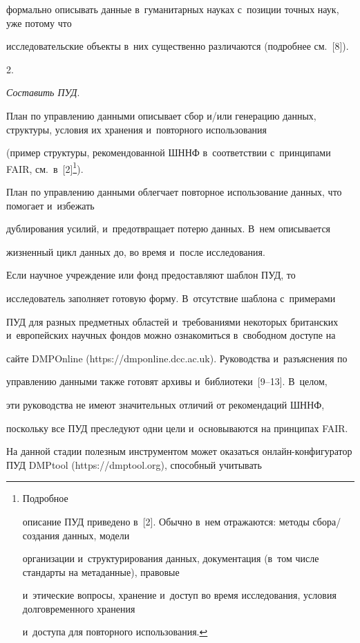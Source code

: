 формально описывать данные в~гуманитарных науках с~позиции точных наук, уже потому что 

исследовательские объекты в~них существенно различаются (подробнее см.~[8]).



2.

\textit{Составить ПУД}.



План по управлению данными описывает сбор и/или генерацию данных, структуры, условия их хранения и~повторного использования 

(пример структуры, рекомендованной ШННФ в~соответствии с~принципами FAIR, см.\ в~[2]\footnote{Подробное 

описание ПУД приведено в~[2]. Обычно в~нем отражаются: методы сбора/создания данных, модели 

организации и~структурирования данных, документация (в~том чис\-ле стандарты на метаданные), правовые 

и~этические вопросы, хранение и~доступ во время исследования, условия долговременного хранения 

и~доступа для повторного использования.}).

  

  План по управлению данными облегчает повторное использование данных, что помогает и~избежать 

дублирования усилий, и~предотвращает потерю данных. В~нем описывается 

жизненный цикл данных до, во время и~после исследования.

  

  Если научное учреждение или фонд предоставляют шаблон ПУД, то 

исследователь заполняет готовую форму. В~отсутствие шаблона с~примерами 

ПУД для разных предметных областей и~требованиями некоторых британских и~европейских научных фондов можно ознакомиться в~свободном доступе на 

сайте DMPOnline ({\sf https://dmponline.dcc.ac.uk}). Руководства и~разъяснения по 

управлению данными также готовят архивы и~библиотеки~[9--13]. В~целом, 

эти руководства не имеют значительных отличий от рекомендаций ШННФ, 

поскольку все ПУД преследуют одни цели и~основываются на принципах FAIR.

  

  На данной стадии полезным инструментом может оказаться онлайн-кон\-фи\-гу\-ра\-тор ПУД DMPtool ({\sf https://dmptool.org}), способный учитывать 

